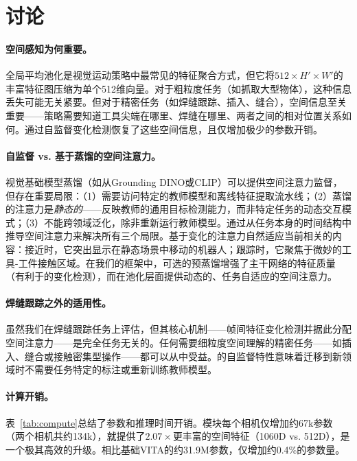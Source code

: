 \section{讨论}
\label{sec:discussion}

\paragraph{空间感知为何重要。}全局平均池化是视觉运动策略中最常见的特征聚合方式，但它将$512 \times H' \times W'$的丰富特征图压缩为单个512维向量。对于粗粒度任务（如抓取大型物体），这种信息丢失可能无关紧要。但对于精密任务（如焊缝跟踪、插入、缝合），空间信息至关重要——策略需要知道工具尖端在哪里、焊缝在哪里、两者之间的相对位置关系如何。\fasa{}通过自监督变化检测恢复了这些空间信息，且仅增加极少的参数开销。

\paragraph{自监督 vs. 基于蒸馏的空间注意力。}视觉基础模型蒸馏（如从Grounding DINO或CLIP）可以提供空间注意力监督，但存在重要局限：（1）需要访问特定的教师模型和离线特征提取流水线；（2）蒸馏的注意力是\emph{静态的}——反映教师的通用目标检测能力，而非特定任务的动态交互模式；（3）不能跨领域泛化，除非重新运行教师模型。\fasa{}通过从任务本身的时间结构中推导空间注意力来解决所有三个局限。基于变化的注意力自然适应当前相关的内容：接近时，它突出显示在静态场景中移动的机器人；跟踪时，它聚焦于微妙的工具-工件接触区域。在我们的框架中，可选的预蒸馏增强了主干网络的特征质量（有利于\fasa{}的变化检测），而\fasa{}在池化层面提供动态的、任务自适应的空间注意力。

\paragraph{焊缝跟踪之外的适用性。}虽然我们在焊缝跟踪任务上评估\fasa{}，但其核心机制——帧间特征变化检测并据此分配空间注意力——是完全任务无关的。任何需要细粒度空间理解的精密任务——如插入、缝合或接触密集型操作——都可以从\fasa{}中受益。\fasa{}的自监督特性意味着迁移到新领域时不需要任务特定的标注或重新训练教师模型。

\paragraph{计算开销。}表~\ref{tab:compute}总结了参数和推理时间开销。\fasa{}模块每个相机仅增加约67k参数（两个相机共约134k），就提供了$2.07\times$更丰富的空间特征（1060D vs. 512D），是一个极其高效的升级。相比基础VITA的约31.9M参数，\fasa{}仅增加约0.4\%的参数量。

